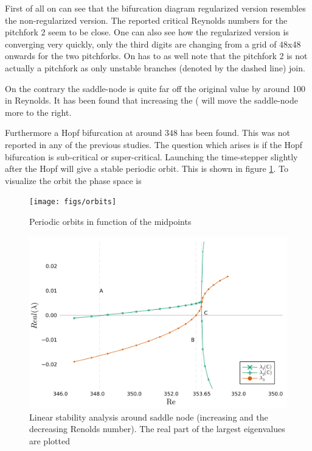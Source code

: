 First of all on can see that the bifurcation diagram regularized version
resembles the non-regularized version. The reported critical Reynolds numbers
for the pitchfork 2 seem to be close. One can also see how the regularized
version is converging very quickly, only the third digits are changing from a
grid of 48x48 onwards for the two pitchforks. On has to as well note that the
pitchfork 2 is not actually a pitchfork as only unstable branches (denoted by
the dashed line) join.   

On the contrary the saddle-node is quite far off the original value by around
100 in Reynolds. It has been found that increasing the ( will move the
saddle-node more to the right. 

Furthermore a Hopf bifurcation at around $348$ has been found. This was not
reported in any of the previous studies. The question which arises is if the
Hopf bifurcation is sub-critical or super-critical. Launching the time-stepper
slightly after the Hopf will give a stable periodic orbit. This is shown in
figure \ref{fig:orbit}. To visualize the orbit the phase space is    

\begin{figure}[h!]
  \begin{center}
  \texttt{[image: figs/orbits]}
  \end{center}
  \label{fig:orbit}
  \caption{Periodic orbits in function of the midpoints} 
\end{figure}

\begin{figure}[h!]
  \begin{center}
  \includegraphics[width=0.6*\textwidth]{figs/lsa_sn}
  \end{center}
  \label{fig:lsa}
  \caption{Linear stability analysis around saddle node (increasing and the decreasing Renolds number). The real
    part of the largest eigenvalues are plotted} 
\end{figure}


